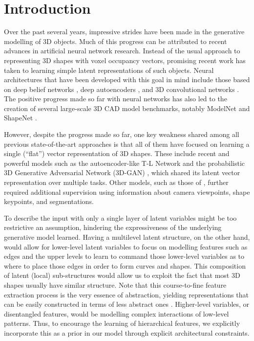 \documentclass[10pt,twocolumn,letterpaper]{article}
\begin{document}
\section{Introduction}
\label{sec:intro}
Over the past several years, impressive strides have been made in the generative modelling of 3D objects. Much of this progress can be attributed to recent advances in artificial neural network research.  Instead of the usual approach to representing 3D shapes with voxel occupancy vectors, promising recent work has taken to learning simple latent representations of such objects. Neural architectures that have been developed with this goal in mind include those based on deep belief networks \cite{wu20153d}, deep autoencoders \cite{zhu2016deep,girdhar2016learning,rezende2016unsupervised}, and 3D convolutional networks \cite{maturana2015voxnet,yan2016perspective,sedaghat2016orientation,choy20163d,hane2017hierarchical}. The positive progress made so far with neural networks has also led to the creation of several large-scale 3D CAD model benchmarks, notably ModelNet \cite{wu20153d} and ShapeNet \cite{chang2015shapenet}.

However, despite the progress made so far, one key weakness shared among all previous state-of-the-art approaches is that all of them have focused on learning a single (``flat'') vector representation of 3D shapes. These include recent and powerful models such as the autoencoder-like T-L Network  \cite{girdhar2016learning} and the probabilistic 3D Generative Adversarial Network (3D-GAN) \cite{wu2016learning}, which shared its latent vector representation over multiple tasks. Other models, such as those of \cite{kar2015category,kar2017learning}, further required additional supervision using information about camera viewpoints, shape keypoints, and segmentations.

To describe the input with only a single layer of latent variables might be too restrictive an assumption, hindering the expressiveness of the underlying generative model learned. Having a multilevel latent structure, on the other hand, would allow for lower-level latent variables to focus on modelling features such as edges and the upper levels to learn to command those lower-level variables as to where to place those edges in order to form curves and shapes. This composition of latent (local) sub-structures would allow us to exploit the fact that most 3D shapes usually have similar structure. Note that this course-to-fine feature extraction process is the very essence of abstraction, yielding representations that can be easily constructed in terms of less abstract ones \cite{bengio2013deep}. Higher-level variables, or disentangled features, would be modelling complex interactions of low-level patterns. Thus, to encourage the learning of hierarchical features, we explicitly incorporate this as a prior in our model through explicit architectural constraints.
\end{document}

